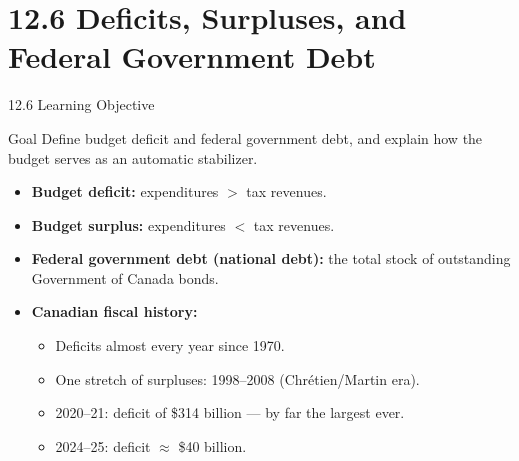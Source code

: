 \documentclass[aspectratio=169]{beamer}
\begin{document}
\section{12.6 Deficits, Surpluses, and Federal Government Debt}

\begin{frame}{12.6 Learning Objective}
\transfade
\begin{block}{Goal}
Define budget deficit and federal government debt, and explain how the budget serves as an automatic stabilizer.
\end{block}
\begin{itemize}
  \item \textbf{Budget deficit:} expenditures $>$ tax revenues.
  \item \textbf{Budget surplus:} expenditures $<$ tax revenues.
  \item \textbf{Federal government debt (national debt):} the total stock of outstanding Government of Canada bonds.
  \item \textbf{Canadian fiscal history:}
  \begin{itemize}
    \item Deficits almost every year since 1970.
    \item One stretch of surpluses: 1998--2008 (Chrétien/Martin era).
    \item \alert{2020--21}: deficit of \$314 billion --- by far the largest ever.
    \item \alert{2024--25}: deficit $\approx$ \$40 billion.
  \end{itemize}
\end{itemize}
\end{frame}
\end{document}
